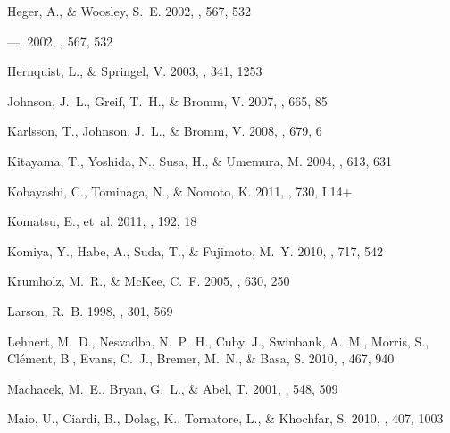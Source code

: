\documentclass[12pt,preprint]{aastex}
\begin{document}
\begin{thebibliography}{108}
{Heger}, A., \& {Woosley}, S.~E. 2002{}, \apj, 567, 532

---. 2002{}, \apj, 567, 532

{Hernquist}, L., \& {Springel}, V. 2003, \mnras, 341, 1253

{Johnson}, J.~L., {Greif}, T.~H., \& {Bromm}, V. 2007, \apj, 665, 85

{Karlsson}, T., {Johnson}, J.~L., \& {Bromm}, V. 2008, \apj, 679, 6

{Kitayama}, T., {Yoshida}, N., {Susa}, H., \& {Umemura}, M. 2004, \apj, 613,
  631

{Kobayashi}, C., {Tominaga}, N., \& {Nomoto}, K. 2011, \apjl, 730, L14+

{Komatsu}, E., {et~al.} 2011, \apjs, 192, 18

{Komiya}, Y., {Habe}, A., {Suda}, T., \& {Fujimoto}, M.~Y. 2010, \apj, 717, 542

{Krumholz}, M.~R., \& {McKee}, C.~F. 2005, \apj, 630, 250

{Larson}, R.~B. 1998, \mnras, 301, 569

{Lehnert}, M.~D., {Nesvadba}, N.~P.~H., {Cuby}, J., {Swinbank}, A.~M.,
  {Morris}, S., {Cl{\'e}ment}, B., {Evans}, C.~J., {Bremer}, M.~N., \& {Basa},
  S. 2010, \nat, 467, 940

{Machacek}, M.~E., {Bryan}, G.~L., \& {Abel}, T. 2001, \apj, 548, 509

{Maio}, U., {Ciardi}, B., {Dolag}, K., {Tornatore}, L., \& {Khochfar}, S. 2010,
  \mnras, 407, 1003


\end{thebibliography}
\end{document}
